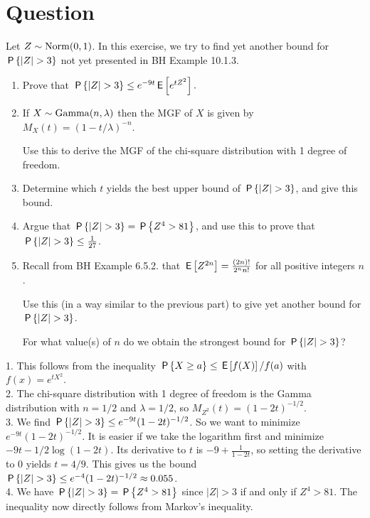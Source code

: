 \section*{Question}


\begin{exercise}
Let $Z \sim \Norm{0,1}$.
In this exercise, we try to find yet another bound for $\P{|Z| > 3}$ not yet presented in BH Example 10.1.3.
\begin{enumerate}
\item Prove that $\P{|Z| > 3} \leq e^{-9t}\E{e^{t Z^2}}.$
\item If $X \sim \Gamm{n, \lambda}$ then the MGF of $X$ is given by $M_X(t) = (1-t/\lambda)^{-n}$.

Use this to derive the MGF of the chi-square distribution with 1 degree of freedom.
\item Determine which $t$ yields the best upper bound of  $\P{|Z| > 3}$, and give this bound.
\item Argue that $\P{|Z| > 3} = \P{Z^4 > 81}$, and use this to prove that $\P{|Z| > 3} \leq \frac1{27}$.
\item Recall from BH Example 6.5.2. that $\E{Z^{2n}} = \frac{(2n)!}{2^n n!}$ for all positive integers $n$.

Use this (in a way similar to the previous part) to give yet another bound for $\P{|Z| > 3}$.

 For what value(s) of $n$ do we obtain the strongest  bound for   $\P{|Z| > 3}$?
\end{enumerate}
\begin{solution}

1. This follows from the inequality $\P{X \geq a} \leq \E{f(X)}/f(a)$ with $f(x) = e^{tX^2}$. \\

2. The chi-square distribution with 1 degree of freedom is the Gamma distribution with $n = 1/2$ and $\lambda = 1/2$, so $M_{Z^2}(t) = (1-2t)^{-1/2}$. \\

3. We find $\P{|Z| > 3} \leq e^{-9t}(1-2t)^{-1/2}$. So we want to minimize $e^{-9t}(1-2t)^{-1/2}$. It is easier if we take the logarithm first and minimize $-9t -1/2 \log(1-2t)$. Its derivative to $t$ is $-9 + \frac1{1-2t}$, so setting the derivative to 0 yields  $t = 4/9$.
This gives us the bound $\P{|Z| > 3} \leq e^{-4}(1-2t)^{-1/2} \approx 0.055$. \\

4. We have $\P{|Z| > 3} = \P{Z^4 > 81}$ since $|Z| >3$ if and only if $Z^4 > 81$. The inequality now directly follows from Markov's inequality. \\


\end{solution}
\end{exercise}
